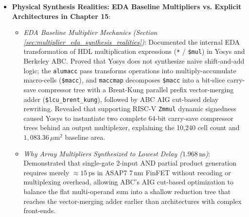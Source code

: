 \begin{itemize}
\begin{itemize}
        (2) \textbf{Dhrystone 2.1}: Cycles dropped from 24,311 to \textbf{19,958 cycles} (CPI $1.76 \to 1.44$), eliminating \textbf{4,353 stall cycles} ($-41.5\%$). Execution time dropped from $33.14\,\mu\text{s}$ to \textbf{$27.20\,\mu\text{s}$} ($1.22\times$ over unforwarded, \textbf{$1.55\times$ over single-cycle}). Score increased from 343.4 to \textbf{418.5 DMIPS} (0.570 DMIPS/MHz, +21.9\%).
        (3) \textbf{DSP Kernel (Soft Mul)}: Cycles dropped from 12,575 to \textbf{8,774 cycles} (CPI $1.93 \to 1.35$), eliminating 3,801 stalls ($-62.7\%$), delivering a \textbf{$1.43\times$ speedup} over unforwarded ($1.66\times$ over single-cycle).
        (4) \textbf{DSP Kernel (Hard Mul)}: Cycles dropped from 1,308 to \textbf{999 cycles} (CPI $1.63 \to 1.24$), eliminating 309 stalls ($-61.3\%$), delivering a \textbf{$1.31\times$ speedup} over unforwarded ($1.36\times$ over single-cycle).
        Demonstrated that spending +2.7\% silicon area eliminates $>60\%$ of all pipeline stalls and drives application throughput up by over 40\%.
    \end{itemize}
    \item \textbf{Physical Synthesis Realities: EDA Baseline Multipliers vs. Explicit Architectures in Chapter 15}:
    \begin{itemize}
        \item \textit{EDA Baseline Multiplier Mechanics (Section \ref{sec:multiplier_eda_synthesis_realities})}: Documented the internal EDA transformation of HDL multiplication expressions (\texttt{*} / \texttt{\$mul}) in Yosys and Berkeley ABC. Proved that Yosys does not synthesize naive shift-and-add logic; the \texttt{alumacc} pass transforms operations into multiply-accumulate macro-cells (\texttt{\$macc}), and \texttt{maccmap} decomposes \texttt{\$macc} into a bit-slice carry-save compressor tree with a Brent-Kung parallel prefix vector-merging adder (\texttt{\$lcu\_brent\_kung}), followed by ABC AIG cut-based delay rewriting. Revealed that supporting RISC-V \texttt{Zmmul} dynamic signedness caused Yosys to instantiate two complete 64-bit carry-save compressor trees behind an output multiplexer, explaining the 10,240 cell count and $1,083.36\,\mu\text{m}^2$ baseline area.
        \item \textit{Why Array Multipliers Synthesized to Lowest Delay ($1.968\,\text{ns}$)}: Demonstrated that single-gate 2-input AND partial product generation requires merely $\approx 15\,\text{ps}$ in ASAP7 7\,nm FinFET without recoding or multiplexing overhead, allowing ABC's AIG cut-based optimization to balance the flat multi-operand sum into a shallow reduction tree that reaches the vector-merging adder earlier than architectures with complex front-ends.

\end{itemize}
\end{itemize}
